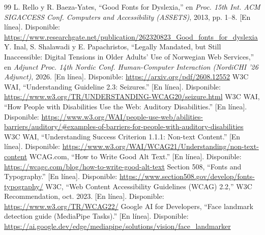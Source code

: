 \documentclass[conference]{IEEEtran}
\begin{document}
\begin{thebibliography}{99}
 L. Rello y R. Baeza-Yates, ``Good Fonts for Dyslexia,'' en \textit{Proc. 15th Int. ACM SIGACCESS Conf. Computers and Accessibility (ASSETS)}, 2013, pp. 1--8. [En línea]. Disponible: \url{https://www.researchgate.net/publication/262320823_Good_fonts_for_dyslexia}
 Y. Inal, S. Shalawadi y E. Papachristos, ``Legally Mandated, but Still Inaccessible: Digital Tensions in Older Adults' Use of Norwegian Web Services,'' en \textit{Adjunct Proc. 14th Nordic Conf. Human-Computer Interaction (NordiCHI '26 Adjunct)}, 2026. [En línea]. Disponible: \url{https://arxiv.org/pdf/2608.12552}
 W3C WAI, ``Understanding Guideline 2.3: Seizures.'' [En línea]. Disponible: \url{https://www.w3.org/TR/UNDERSTANDING-WCAG20/seizure.html}
 W3C WAI, ``How People with Disabilities Use the Web: Auditory Disabilities.'' [En línea]. Disponible: \url{https://www.w3.org/WAI/people-use-web/abilities-barriers/auditory/#examples-of-barriers-for-people-with-auditory-disabilities}
 W3C WAI, ``Understanding Success Criterion 1.1.1: Non-text Content.'' [En línea]. Disponible: \url{https://www.w3.org/WAI/WCAG21/Understanding/non-text-content}
 WCAG.com, ``How to Write Good Alt Text.'' [En línea]. Disponible: \url{https://wcagc.com/blog/how-to-write-good-alt-text}
 Section 508, ``Fonts and Typography.'' [En línea]. Disponible: \url{https://www.section508.gov/develop/fonts-typography/}
 W3C, ``Web Content Accessibility Guidelines (WCAG) 2.2,'' W3C Recommendation, oct. 2023. [En línea]. Disponible: \url{https://www.w3.org/TR/WCAG22/}
 Google AI for Developers, ``Face landmark detection guide (MediaPipe Tasks).'' [En línea]. Disponible: \url{https://ai.google.dev/edge/mediapipe/solutions/vision/face_landmarker}
\end{thebibliography}
\end{document}
